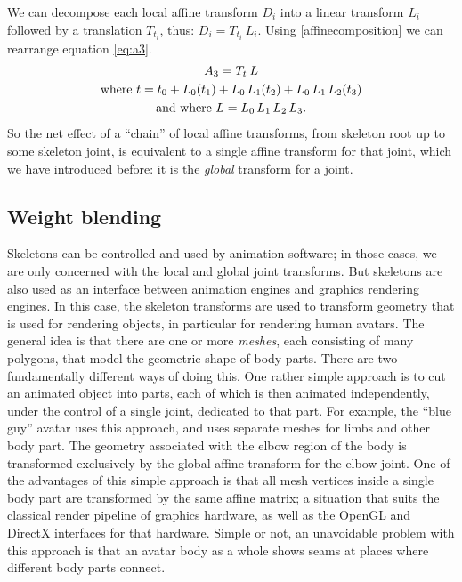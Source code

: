 %
We can decompose each local affine transform $D_i$ into a linear transform $L_i$ followed by
a translation $T_{t_i}$, thus: $D_i = T_{t_i}\: L_i$.
Using \eqref{affinecomposition} we can rearrange equation \eqref{eq:a3}.
%
\begin{gather}
A_3 = T_t \: L\\
 \text{where } t = t_0 + L_0(t_1) + L_0\,L_1(t_2) + L_0\,L_1\,L_2(t_3)\notag\\
 \text{and where } L= L_0\,L_1\,L_2\,L_3.\notag
\end{gather}
%
So the net effect of a ``chain'' of local affine transforms, from skeleton root up to some skeleton joint,
is equivalent to a single affine transform for that joint, which we have introduced before: it is the
\emph{global} transform for a joint.

\subsection{Weight blending}\label{sect:weightblending}



Skeletons can be controlled and used by animation software; in those cases, we are only concerned
with the local and global joint transforms. But skeletons are also used as an interface between
animation engines and graphics rendering engines.
In this case, the skeleton transforms are used
to transform geometry that is used for rendering objects, in particular for rendering human avatars.
The general idea is that there are one or more \emph{meshes}, each consisting of many polygons,
that model the  geometric shape of body parts.
There are two fundamentally different ways of doing this.
One rather simple approach is to cut an animated object into parts, each of which is then animated independently,
under the control of a single joint, dedicated to that part. For example, the ``blue guy'' avatar
uses this approach, and uses separate meshes for limbs and other body part.
The geometry associated with the elbow region of the body  is transformed exclusively
by the global affine transform for the elbow joint.
One of the advantages of this simple approach is that all mesh vertices inside a single body part
are transformed by the same affine matrix; a situation that suits the classical render pipeline
of graphics hardware, as well as the OpenGL and DirectX interfaces for that hardware.
 Simple or not, an unavoidable problem with this approach is that an avatar body as a whole
 shows seams at places where different body parts connect.

